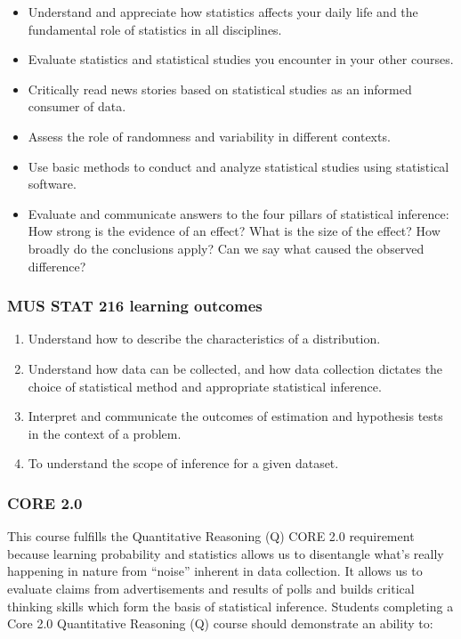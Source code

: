 \documentclass[
]{article}
\providecommand{\tightlist}{%
  \setlength{\itemsep}{0pt}\setlength{\parskip}{0pt}}
\begin{document}
\begin{itemize}
\tightlist
\item
  Understand and appreciate how statistics affects your daily life and
  the fundamental role of statistics in all disciplines.
\item
  Evaluate statistics and statistical studies you encounter in your
  other courses.
\item
  Critically read news stories based on statistical studies as an
  informed consumer of data.
\item
  Assess the role of randomness and variability in different contexts.
\item
  Use basic methods to conduct and analyze statistical studies using
  statistical software.
\item
  Evaluate and communicate answers to the four pillars of statistical
  inference: How strong is the evidence of an effect? What is the size
  of the effect? How broadly do the conclusions apply? Can we say what
  caused the observed difference?
\end{itemize}

\subsubsection{MUS STAT 216 learning
outcomes}\label{mus-stat-216-learning-outcomes}

\begin{enumerate}
\def\labelenumi{\arabic{enumi}.}
\tightlist
\item
  Understand how to describe the characteristics of a distribution.
\item
  Understand how data can be collected, and how data collection dictates
  the choice of statistical method and appropriate statistical
  inference.
\item
  Interpret and communicate the outcomes of estimation and hypothesis
  tests in the context of a problem.
\item
  To understand the scope of inference for a given dataset.
\end{enumerate}

\subsubsection{CORE 2.0}\label{core-2.0}

This course fulfills the Quantitative Reasoning (Q) CORE 2.0 requirement
because learning probability and statistics allows us to disentangle
what's really happening in nature from ``noise'' inherent in data
collection. It allows us to evaluate claims from advertisements and
results of polls and builds critical thinking skills which form the
basis of statistical inference. Students completing a Core 2.0
Quantitative Reasoning (Q) course should demonstrate an ability to:
\end{document}
